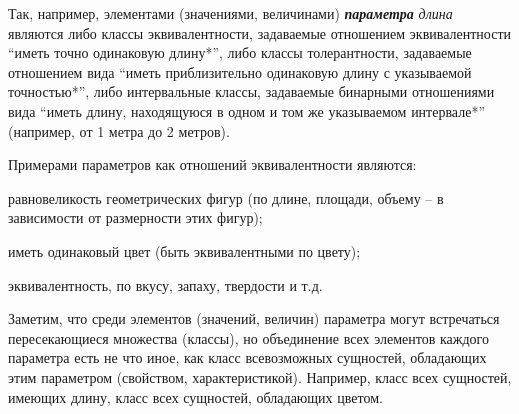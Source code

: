 Так, например, элементами (значениями, величинами) \textbf{\textit{параметра}} \textit{длина} являются либо классы эквивалентности, задаваемые отношением эквивалентности ``иметь точно одинаковую длину*'', либо классы толерантности, задаваемые отношением вида ``иметь приблизительно одинаковую длину с указываемой точностью*'', либо интервальные классы, задаваемые бинарными отношениями вида ``иметь длину, находящуюся в одном и том же указываемом интервале*'' (например, от 1 метра до 2 метров).

Примерами параметров как отношений эквивалентности являются:

\begin{textitemize}
	\item равновеликость геометрических фигур (по длине, площади, объему -- в зависимости от размерности этих фигур);
	\item иметь одинаковый цвет (быть эквивалентными по цвету);
	\item эквивалентность, по вкусу, запаху, твердости и т.д.
\end{textitemize}

Заметим, что среди элементов (значений, величин) параметра могут встречаться пересекающиеся множества (классы), но объединение всех элементов каждого параметра есть не что иное, как класс всевозможных сущностей, обладающих этим параметром (свойством, характеристикой). Например, класс всех сущностей, имеющих длину, класс всех сущностей, обладающих цветом.

